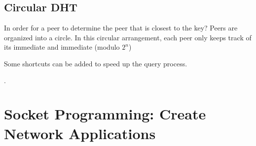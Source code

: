     \subsection{Circular DHT}
    
    \hf In order for a peer to determine the peer that is closest to the key? Peers are organized into a circle. 
    In this circular arrangement, each peer only keeps track of its immediate  and immediate  (modulo $2^n$)



    Some shortcuts can be added to speed up the query process.

    .


\section{Socket Programming: Create Network Applications}

